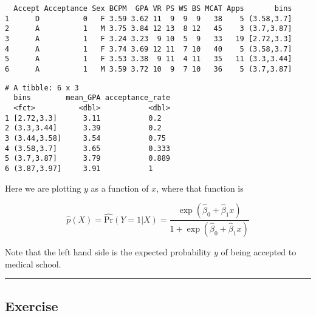 \documentclass[]{book}
\newenvironment{Shaded}{\begin{snugshade}}{\end{snugshade}}
\newcommand{\KeywordTok}[1]{\textcolor[rgb]{0.13,0.29,0.53}{\textbf{#1}}}
\newcommand{\DataTypeTok}[1]{\textcolor[rgb]{0.13,0.29,0.53}{#1}}
\newcommand{\StringTok}[1]{\textcolor[rgb]{0.31,0.60,0.02}{#1}}
\newcommand{\OperatorTok}[1]{\textcolor[rgb]{0.81,0.36,0.00}{\textbf{#1}}}
\newcommand{\NormalTok}[1]{#1}
\begin{document}
\begin{verbatim}
  Accept Acceptance Sex BCPM  GPA VR PS WS BS MCAT Apps       bins
1      D          0   F 3.59 3.62 11  9  9  9   38    5 (3.58,3.7]
2      A          1   M 3.75 3.84 12 13  8 12   45    3 (3.7,3.87]
3      A          1   F 3.24 3.23  9 10  5  9   33   19 [2.72,3.3]
4      A          1   F 3.74 3.69 12 11  7 10   40    5 (3.58,3.7]
5      A          1   F 3.53 3.38  9 11  4 11   35   11 (3.3,3.44]
6      A          1   M 3.59 3.72 10  9  7 10   36    5 (3.7,3.87]
\end{verbatim}

\begin{Shaded}
\end{Shaded}

\begin{verbatim}
# A tibble: 6 x 3
  bins        mean_GPA acceptance_rate
  <fct>          <dbl>           <dbl>
1 [2.72,3.3]      3.11           0.2  
2 (3.3,3.44]      3.39           0.2  
3 (3.44,3.58]     3.54           0.75 
4 (3.58,3.7]      3.65           0.333
5 (3.7,3.87]      3.79           0.889
6 (3.87,3.97]     3.91           1    
\end{verbatim}

Here we are plotting \(y\) as a function of \(x\), where that function
is

\begin{equation}
\hat{p}(X) = \widehat{\text{Pr}}(Y=1|X) = \frac{\exp(\hat{\beta}_0 + \hat{\beta}_1 x)}{1 + \exp(\hat{\beta}_0 + \hat{\beta}_1 x)}
\end{equation}

Note that the left hand side is the expected probability \(y\) of being
accepted to medical school.

\begin{center}\rule{0.5\linewidth}{\linethickness}\end{center}

\subsection*{Exercise}\label{exercise-16}
\end{document}
